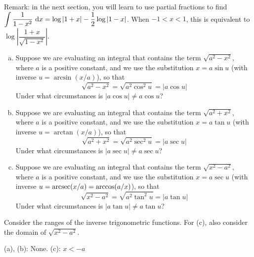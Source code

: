 \begin{solution}
\begin{enumerate}[(a)]
Remark: in the next section, you will learn to use partial fractions to find $\displaystyle\int \dfrac{1}{1-x^2}~\mathrm{d}x = \log|1+x|-\dfrac{1}{2}\log|1-x|$. When $-1<x<1$, this is equivalent to $\log\left| \dfrac{1+x}{\sqrt{1-x^2}}\right|$.
\end{enumerate}

\end{solution}




\begin{question}
\begin{enumerate}[(a)]
\item Suppose we are evaluating an integral that contains the term $\sqrt{a^2-x^2}$, where $a$ is a positive constant, and we use the substitution $x=a\sin u$ (with inverse $u = \arcsin(x/a)$), so that
\[\sqrt{a^2-x^2} = \sqrt{a^2\cos^2u}= |a\cos u|\]
Under what circumstances is $|a\cos u|\neq a\cos u$?
\item Suppose we are evaluating an integral that contains the term $\sqrt{a^2+x^2}$, where $a$ is a positive constant, and we use the substitution $x=a\tan u$ (with inverse $u = \arctan(x/a)$), so that
\[\sqrt{a^2+x^2} = \sqrt{a^2\sec^2u}= |a\sec u|\]
Under what circumstances is $|a\sec u|\neq a\sec u$?
\item Suppose we are evaluating an integral that contains the term $\sqrt{x^2-a^2}$, where $a$ is a positive constant, and we use the substitution $x=a\sec u$ (with inverse $u = \mathop{\mathrm{arcsec}}(x/a)=\arccos(a/x)$), so that
\[\sqrt{x^2-a^2} = \sqrt{a^2\tan^2u}= |a\tan u|\]
Under what circumstances is $|a\tan u|\neq a\tan u$?

\end{enumerate}
\end{question}
\begin{hint}
Consider the ranges of the inverse trigonometric functions. For (c), also consider the domain of $\sqrt{x^2-a^2}$.
\end{hint}
\begin{answer}
(a), (b): None. \qquad (c): $x< -a$
\end{answer}
